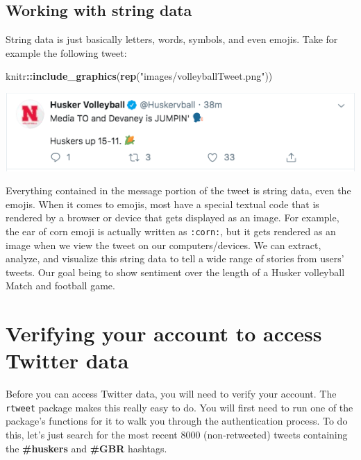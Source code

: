 \documentclass[
]{book}
\newenvironment{Shaded}{\begin{snugshade}}{\end{snugshade}}
\newcommand{\KeywordTok}[1]{\textcolor[rgb]{0.13,0.29,0.53}{\textbf{#1}}}
\newcommand{\NormalTok}[1]{#1}
\newcommand{\OperatorTok}[1]{\textcolor[rgb]{0.81,0.36,0.00}{\textbf{#1}}}
\newcommand{\StringTok}[1]{\textcolor[rgb]{0.31,0.60,0.02}{#1}}
\begin{document}
\hypertarget{working-with-string-data}{%
\subsection{Working with string data}\label{working-with-string-data}}

String data is just basically letters, words, symbols, and even emojis. Take for example the following tweet:

\begin{Shaded}
\begin{Highlighting}[]
\NormalTok{knitr}\OperatorTok{::}\KeywordTok{include_graphics}\NormalTok{(}\KeywordTok{rep}\NormalTok{(}\StringTok{"images/volleyballTweet.png"}\NormalTok{))}
\end{Highlighting}
\end{Shaded}

\includegraphics[width=7.53in]{images/volleyballTweet}

Everything contained in the message portion of the tweet is string data, even the emojis. When it comes to emojis, most have a special textual code that is rendered by a browser or device that gets displayed as an image. For example, the ear of corn emoji is actually written as \texttt{:corn:}, but it gets rendered as an image when we view the tweet on our computers/devices. We can extract, analyze, and visualize this string data to tell a wide range of stories from users' tweets. Our goal being to show sentiment over the length of a Husker volleyball Match and football game.

\hypertarget{verifying-your-account-to-access-twitter-data}{%
\section{Verifying your account to access Twitter data}\label{verifying-your-account-to-access-twitter-data}}

Before you can access Twitter data, you will need to verify your account. The \texttt{rtweet} package makes this really easy to do. You will first need to run one of the package's functions for it to walk you through the authentication process. To do this, let's just search for the most recent 8000 (non-retweeted) tweets containing the \textbf{\#huskers} and \textbf{\#GBR} hashtags.
\end{document}
